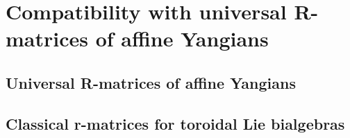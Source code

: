 \section{Compatibility with universal R-matrices of affine Yangians}
    \subsection{Universal R-matrices of affine Yangians}

    \subsection{Classical r-matrices for toroidal Lie bialgebras}
